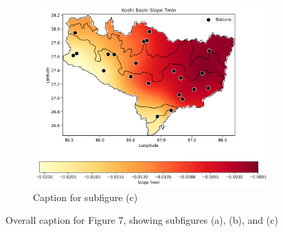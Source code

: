\documentclass{article}
\begin{document}
\begin{figure}[htbp]
    \begin{subfigure}{0.45\textwidth}
        \centering
        \includegraphics[width=\linewidth]{figure3.png}
        \caption{Caption for subfigure (c)}
        \label{fig:7c}
    \end{subfigure}
    
    \caption{Overall caption for Figure 7, showing subfigures (a), (b), and (c)}
    \label{fig:7}
\end{figure}
\end{document}
